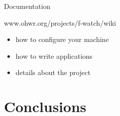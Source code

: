 \documentclass[compress,red]{beamer}
\begin{document}

\begin{frame}
  \begin{center}
    \begin{figure}[h!]
      \centering
    \end{figure}
  \end{center}
\end{frame}


\begin{frame}{Documentation}
  \Large
  \begin{center}
      www.ohwr.org/projects/f-watch/wiki
  \end{center}
  \vskip 1cm
  \begin{itemize}
  \item how to configure your machine
    \vskip 7mm
  \item how to write applications
    \vskip 7mm
  \item details about the project
  \end{itemize}

\end{frame}

\section{Conclusions}
\end{document}
